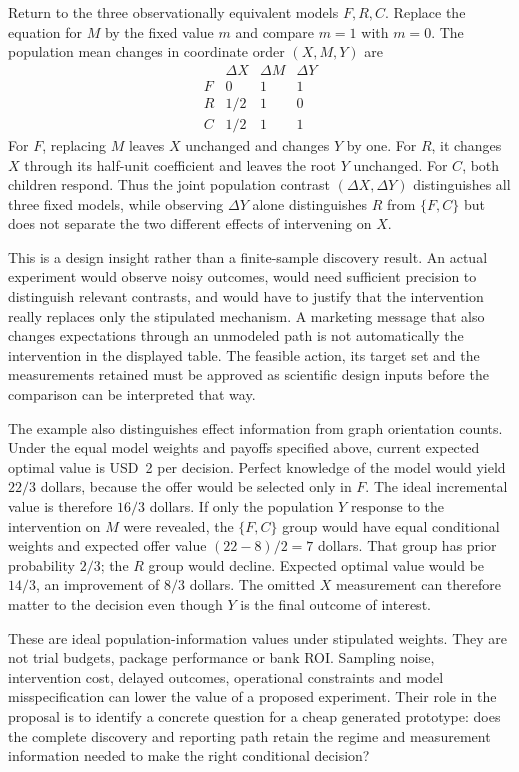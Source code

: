 Return to the three observationally equivalent models $F,R,C$. Replace the
equation for $M$ by the fixed value $m$ and compare $m=1$ with $m=0$.
The population mean changes in coordinate order $(X,M,Y)$ are
\[
 \begin{array}{c|ccc}
  &\Delta X&\Delta M&\Delta Y\\\hline
 F&0&1&1\\
 R&1/2&1&0\\
 C&1/2&1&1
 \end{array}
\]
For $F$, replacing $M$ leaves $X$ unchanged and changes $Y$ by one.
For $R$, it changes $X$ through its half-unit coefficient and leaves the
root $Y$ unchanged. For $C$, both children respond. Thus the joint population
contrast $(\Delta X,\Delta Y)$ distinguishes all three fixed models, while
observing $\Delta Y$ alone distinguishes $R$ from $\{F,C\}$ but does not
separate the two different effects of intervening on $X$.
\citep{exec16_s2_exact}

This is a design insight rather than a finite-sample discovery result. An
actual experiment would observe noisy outcomes, would need sufficient
precision to distinguish relevant contrasts, and would have to justify that
the intervention really replaces only the stipulated mechanism. A marketing
message that also changes expectations through an unmodeled path is not
automatically the intervention in the displayed table. The feasible action,
its target set and the measurements retained must be approved as scientific
design inputs before the comparison can be interpreted that way.

The example also distinguishes effect information from graph orientation
counts. Under the equal model weights and payoffs specified above, current
expected optimal value is USD~2 per decision. Perfect knowledge of the model
would yield $22/3$ dollars, because the offer would be selected only in $F$.
The ideal incremental value is therefore $16/3$ dollars. If only the
population $Y$ response to the intervention on $M$ were revealed, the
$\{F,C\}$ group would have equal conditional weights and expected offer
value $(22-8)/2=7$ dollars. That group has prior probability $2/3$;
the $R$ group would decline. Expected optimal value would be $14/3$,
an improvement of $8/3$ dollars. The omitted $X$ measurement can therefore
matter to the decision even though $Y$ is the final outcome of interest.
\citep{exec16_s2_exact}

These are ideal population-information values under stipulated weights.
They are not trial budgets, package performance or bank ROI. Sampling noise,
intervention cost, delayed outcomes, operational constraints and model
misspecification can lower the value of a proposed experiment. Their role in
the proposal is to identify a concrete question for a cheap generated
prototype: does the complete discovery and reporting path retain the regime
and measurement information needed to make the right conditional decision?

